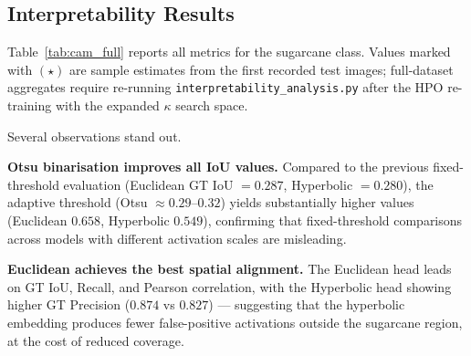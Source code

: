 \documentclass[12pt,a4paper]{article}
\newcommand{\kap}{\kappa}
\theoremstyle{definition}
\begin{document}
\subsection{Interpretability Results}

Table~\ref{tab:cam_full} reports all metrics for the sugarcane class.
Values marked with $(\star)$ are sample estimates from the first recorded
test images; full-dataset aggregates require re-running
\texttt{interpretability\_analysis.py} after the HPO re-training with the
expanded $\kap$ search space.

\begin{table}[h]
\centering
\caption{SegScoreCAM interpretability metrics on the sugarcane class
  (sample values from available test images, new metric suite with Otsu
  binarisation).  All GT-alignment metrics are higher-is-better;
  Mean Activation is lower-is-better.  Confidence gain is the mean \%
  change in softmax probability on GT-positive pixels when the input is
  masked by the CAM.}
\label{tab:cam_full}
\end{table}

Several observations stand out.

\textbf{Otsu binarisation improves all IoU values.}
Compared to the previous fixed-threshold evaluation
(Euclidean GT IoU $= 0.287$, Hyperbolic $= 0.280$), the adaptive threshold
(Otsu $\approx 0.29$--$0.32$) yields substantially higher values
(Euclidean $0.658$, Hyperbolic $0.549$), confirming that fixed-threshold
comparisons across models with different activation scales are misleading.

\textbf{Euclidean achieves the best spatial alignment.}
The Euclidean head leads on GT IoU, Recall, and Pearson correlation, with
the Hyperbolic head showing higher GT Precision ($0.874$ vs $0.827$) —
suggesting that the hyperbolic embedding produces fewer false-positive
activations outside the sugarcane region, at the cost of reduced coverage.
\end{document}
